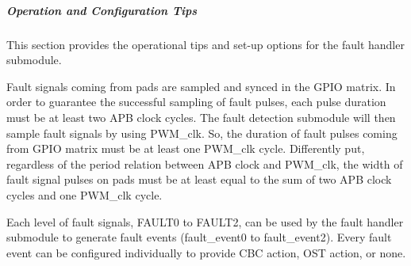 \documentclass[main\_\_EN.tex]{subfiles}
\begin{document}
\subparagraph{Operation and Configuration Tips}
This section provides the operational tips and set-up options for the fault handler submodule.

Fault signals coming from pads are sampled and synced in the GPIO matrix. In order to guarantee the successful sampling of fault pulses, each pulse duration must be at least two APB clock cycles. The fault detection submodule will then sample fault signals by using PWM\_clk. So, the duration of fault pulses coming from GPIO matrix must be at least one PWM\_clk cycle. Differently put, regardless of the period relation between APB clock and PWM\_clk, the width of fault signal pulses on pads must be at least equal to the sum of two APB clock cycles and one PWM\_clk cycle.

Each level of fault signals, FAULT0 to FAULT2, can be used by the fault handler submodule to generate fault events (fault\_event0 to fault\_event2). Every fault event can be configured individually to provide CBC action, OST action, or none.
\end{document}

